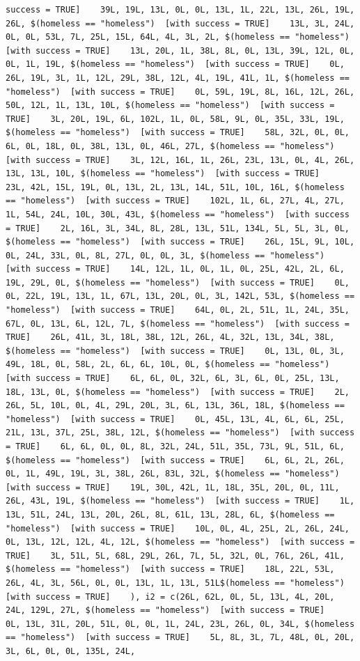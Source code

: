 \documentclass{tufte-book}\usepackage[]{graphicx}\usepackage[]{xcolor}
\makeatletter
\newenvironment{kframe}{%
 \def\at@end@of@kframe{}%
 \ifinner\ifhmode%
  \def\at@end@of@kframe{\end{minipage}}%
  \begin{minipage}{\columnwidth}%
 \fi\fi%
 \def\FrameCommand##1{\hskip\@totalleftmargin \hskip-\fboxsep
 \colorbox{shadecolor}{##1}\hskip-\fboxsep
     \hskip-\linewidth \hskip-\@totalleftmargin \hskip\columnwidth}%
 \MakeFramed {\advance\hsize-\width
   \@totalleftmargin\z@ \linewidth\hsize
   \@setminipage}}%
 {\par\unskip\endMakeFramed%
 \at@end@of@kframe}
\newenvironment{knitrout}{}{} %
\makeatother
\begin{document}
\begin{knitrout}
\begin{kframe}
\begin{verbatim}
success = TRUE]    39L, 19L, 13L, 0L, 0L, 13L, 1L, 22L, 13L, 26L, 19L, 26L, $(homeless == "homeless")  [with success = TRUE]    13L, 3L, 24L, 0L, 0L, 53L, 7L, 25L, 15L, 64L, 4L, 3L, 2L, $(homeless == "homeless")  [with success = TRUE]    13L, 20L, 1L, 38L, 8L, 0L, 13L, 39L, 12L, 0L, 0L, 1L, 19L, $(homeless == "homeless")  [with success = TRUE]    0L, 26L, 19L, 3L, 1L, 12L, 29L, 38L, 12L, 4L, 19L, 41L, 1L, $(homeless == "homeless")  [with success = TRUE]    0L, 59L, 19L, 8L, 16L, 12L, 26L, 50L, 12L, 1L, 13L, 10L, $(homeless == "homeless")  [with success = TRUE]    3L, 20L, 19L, 6L, 102L, 1L, 0L, 58L, 9L, 0L, 35L, 33L, 19L, $(homeless == "homeless")  [with success = TRUE]    58L, 32L, 0L, 0L, 6L, 0L, 18L, 0L, 38L, 13L, 0L, 46L, 27L, $(homeless == "homeless")  [with success = TRUE]    3L, 12L, 16L, 1L, 26L, 23L, 13L, 0L, 4L, 26L, 13L, 13L, 10L, $(homeless == "homeless")  [with success = TRUE]    23L, 42L, 15L, 19L, 0L, 13L, 2L, 13L, 14L, 51L, 10L, 16L, $(homeless == "homeless")  [with success = TRUE]    102L, 1L, 6L, 27L, 4L, 27L, 1L, 54L, 24L, 10L, 30L, 43L, $(homeless == "homeless")  [with success = TRUE]    2L, 16L, 3L, 34L, 8L, 28L, 13L, 51L, 134L, 5L, 5L, 3L, 0L, $(homeless == "homeless")  [with success = TRUE]    26L, 15L, 9L, 10L, 0L, 24L, 33L, 0L, 8L, 27L, 0L, 0L, 3L, $(homeless == "homeless")  [with success = TRUE]    14L, 12L, 1L, 0L, 1L, 0L, 25L, 42L, 2L, 6L, 19L, 29L, 0L, $(homeless == "homeless")  [with success = TRUE]    0L, 0L, 22L, 19L, 13L, 1L, 67L, 13L, 20L, 0L, 3L, 142L, 53L, $(homeless == "homeless")  [with success = TRUE]    64L, 0L, 2L, 51L, 1L, 24L, 35L, 67L, 0L, 13L, 6L, 12L, 7L, $(homeless == "homeless")  [with success = TRUE]    26L, 41L, 3L, 18L, 38L, 12L, 26L, 4L, 32L, 13L, 34L, 38L, $(homeless == "homeless")  [with success = TRUE]    0L, 13L, 0L, 3L, 49L, 18L, 0L, 58L, 2L, 6L, 6L, 10L, 0L, $(homeless == "homeless")  [with success = TRUE]    6L, 6L, 0L, 32L, 6L, 3L, 6L, 0L, 25L, 13L, 18L, 13L, 0L, $(homeless == "homeless")  [with success = TRUE]    2L, 26L, 5L, 10L, 0L, 4L, 29L, 20L, 3L, 6L, 13L, 36L, 18L, $(homeless == "homeless")  [with success = TRUE]    0L, 45L, 13L, 4L, 6L, 6L, 25L, 21L, 13L, 37L, 25L, 38L, 12L, $(homeless == "homeless")  [with success = TRUE]    6L, 6L, 0L, 0L, 8L, 32L, 24L, 51L, 35L, 73L, 9L, 51L, 6L, $(homeless == "homeless")  [with success = TRUE]    6L, 6L, 2L, 26L, 0L, 1L, 49L, 19L, 3L, 38L, 26L, 83L, 32L, $(homeless == "homeless")  [with success = TRUE]    19L, 30L, 42L, 1L, 18L, 35L, 20L, 0L, 11L, 26L, 43L, 19L, $(homeless == "homeless")  [with success = TRUE]    1L, 13L, 51L, 24L, 13L, 20L, 26L, 8L, 61L, 13L, 28L, 6L, $(homeless == "homeless")  [with success = TRUE]    10L, 0L, 4L, 25L, 2L, 26L, 24L, 0L, 13L, 12L, 12L, 4L, 12L, $(homeless == "homeless")  [with success = TRUE]    3L, 51L, 5L, 68L, 29L, 26L, 7L, 5L, 32L, 0L, 76L, 26L, 41L, $(homeless == "homeless")  [with success = TRUE]    18L, 22L, 53L, 26L, 4L, 3L, 56L, 0L, 0L, 13L, 1L, 13L, 51L$(homeless == "homeless")  [with success = TRUE]    ), i2 = c(26L, 62L, 0L, 5L, 13L, 4L, 20L, 24L, 129L, 27L, $(homeless == "homeless")  [with success = TRUE]    0L, 13L, 31L, 20L, 51L, 0L, 0L, 1L, 24L, 23L, 26L, 0L, 34L, $(homeless == "homeless")  [with success = TRUE]    5L, 8L, 3L, 7L, 48L, 0L, 20L, 3L, 6L, 0L, 0L, 135L, 24L, 
\end{verbatim}
\end{kframe}
\end{knitrout}
\end{document}
